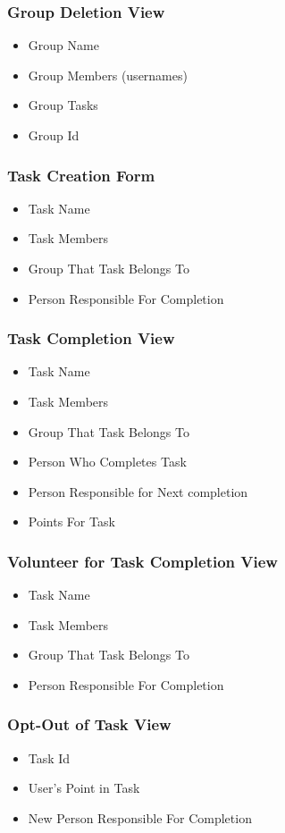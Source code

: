 \documentclass[a4paper]{article}
\begin{document}
\subsubsection*{Group Deletion View}
\begin{itemize}
\item Group Name
\item Group Members (usernames)
\item Group Tasks
\item Group Id
\end{itemize}

\subsubsection*{Task Creation Form}
\begin{itemize}
\item Task Name
\item Task Members
\item Group That Task Belongs To
\item Person Responsible For Completion
\end{itemize}

\subsubsection*{Task Completion View}
\begin{itemize}
\item Task Name
\item Task Members
\item Group That Task Belongs To
\item Person Who Completes Task
\item	Person Responsible for Next completion
\item Points For Task
\end{itemize}

\subsubsection*{Volunteer for Task Completion View}
\begin{itemize}
\item Task Name
\item Task Members
\item Group That Task Belongs To
\item Person Responsible For Completion
\end{itemize}

\subsubsection*{Opt-Out of Task View}
\begin{itemize}
\item Task Id
\item User's Point in Task
\item New Person Responsible For Completion
\end{itemize}
\end{document}
